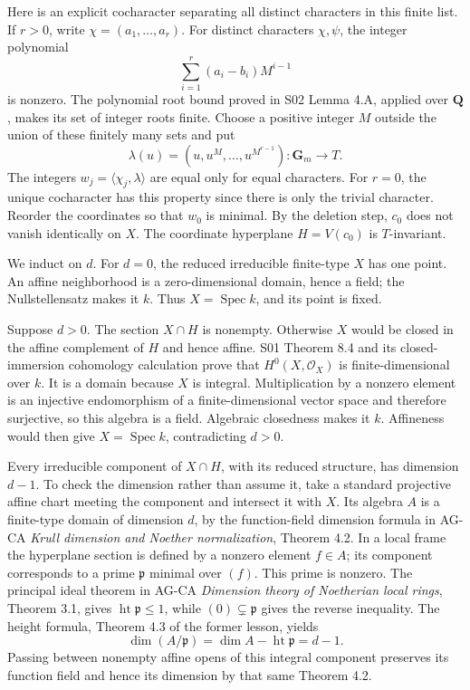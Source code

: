 \documentclass[11pt,a4paper,openany]{report}
\newcounter{none}
\begin{document}
Here is an explicit cocharacter separating all distinct characters in this finite list. If \(r>0\), write \(\chi=(a_1,\ldots,a_r)\). For distinct characters \(\chi,\psi\), the integer polynomial \[
 \sum_{i=1}^r(a_i-b_i)M^{i-1}
\] is nonzero. The polynomial root bound proved in S02 Lemma 4.A, applied over \(\mathbf Q\), makes its set of integer roots finite. Choose a positive integer \(M\) outside the union of these finitely many sets and put \[
 \lambda(u)=(u,u^M,\ldots,u^{M^{r-1}}):
                  \mathbf G_m\longrightarrow T.
\] The integers \(w_j=\langle\chi_j,\lambda\rangle\) are equal only for equal characters. For \(r=0\), the unique cocharacter has this property since there is only the trivial character. Reorder the coordinates so that \(w_0\) is minimal. By the deletion step, \(c_0\) does not vanish identically on \(X\). The coordinate hyperplane \(H=V(c_0)\) is \(T\)-invariant.

We induct on \(d\). For \(d=0\), the reduced irreducible finite-type \(X\) has one point. An affine neighborhood is a zero-dimensional domain, hence a field; the Nullstellensatz makes it \(k\). Thus \(X=\operatorname{Spec}k\), and its point is fixed.

Suppose \(d>0\). The section \(X\cap H\) is nonempty. Otherwise \(X\) would be closed in the affine complement of \(H\) and hence affine. S01 Theorem 8.4 and its closed-immersion cohomology calculation prove that \(H^0(X,\mathcal O_X)\) is finite-dimensional over \(k\). It is a domain because \(X\) is integral. Multiplication by a nonzero element is an injective endomorphism of a finite-dimensional vector space and therefore surjective, so this algebra is a field. Algebraic closedness makes it \(k\). Affineness would then give \(X=\operatorname{Spec}k\), contradicting \(d>0\).

Every irreducible component of \(X\cap H\), with its reduced structure, has dimension \(d-1\). To check the dimension rather than assume it, take a standard projective affine chart meeting the component and intersect it with \(X\). Its algebra \(A\) is a finite-type domain of dimension \(d\), by the function-field dimension formula in AG-CA \emph{Krull dimension and Noether normalization}, Theorem 4.2. In a local frame the hyperplane section is defined by a nonzero element \(f\in A\); its component corresponds to a prime \(\mathfrak p\) minimal over \((f)\). This prime is nonzero. The principal ideal theorem in AG-CA \emph{Dimension theory of Noetherian local rings}, Theorem 3.1, gives \(\operatorname{ht}\mathfrak p\le1\), while \((0)\subsetneq\mathfrak p\) gives the reverse inequality. The height formula, Theorem 4.3 of the former lesson, yields \[
 \dim(A/\mathfrak p)=\dim A-\operatorname{ht}\mathfrak p=d-1.
\] Passing between nonempty affine opens of this integral component preserves its function field and hence its dimension by that same Theorem 4.2.
\end{document}
